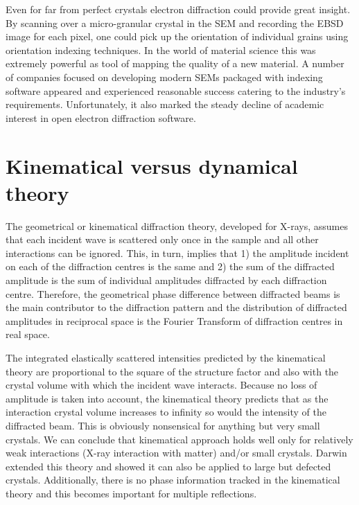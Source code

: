 Even for far from perfect crystals electron diffraction could provide great insight. By scanning over a micro-granular crystal in the SEM and recording the EBSD image for each pixel, one could pick up the orientation of individual grains using orientation indexing techniques. In the world of material science this was extremely powerful as tool of mapping the quality of a new material. A number of companies focused on developing modern SEMs packaged with indexing software appeared and experienced reasonable success catering to the industry's requirements. Unfortunately, it also marked the steady decline of academic interest in open electron diffraction software.



\section{Kinematical versus dynamical theory}
\label{sec:kinvsDyn}
The geometrical or kinematical diffraction theory, developed for X-rays, assumes that each incident wave is scattered only once in the sample and all other interactions can be ignored. This, in turn, implies that  1) the amplitude incident on each of the diffraction centres is the same and 2) the sum of the diffracted amplitude is the sum of individual amplitudes diffracted by each diffraction centre. Therefore, the geometrical phase difference between diffracted beams is the main contributor to the diffraction pattern and the distribution of diffracted amplitudes in reciprocal space is the Fourier Transform of diffraction centres in real space.  

The integrated elastically scattered intensities predicted by the kinematical theory are proportional to the square of the structure factor and also with the crystal volume with which the incident wave interacts. Because no loss of amplitude is taken into account, the kinematical theory predicts that as the interaction crystal volume increases to infinity so would the intensity of the diffracted beam. This is obviously nonsensical for anything but very small crystals. We can conclude that kinematical approach holds well only for relatively weak interactions (X-ray interaction with matter) and/or small crystals. Darwin~\cite{Darwin22} extended this theory and showed it can also be applied to large but defected crystals. Additionally, there is no phase information tracked in the kinematical theory and this becomes important for multiple reflections. 
 
